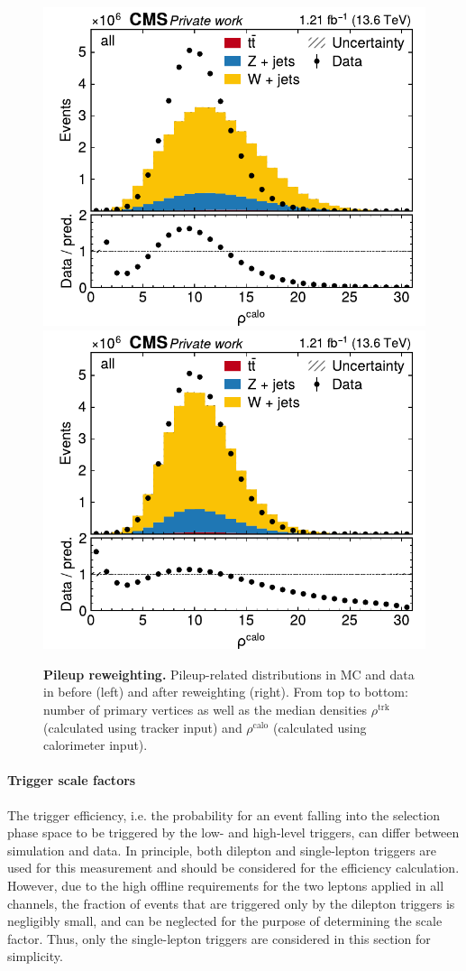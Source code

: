 \begin{figure}[p]
    \includegraphics[width=0.49 \textwidth]{figures/ttxs/pileup/rhoFastjetCentralCalo_orig.pdf}
    \hfill
    \includegraphics[width=0.49 \textwidth]{figures/ttxs/pileup/rhoFastjetCentralCalo_reweighted.pdf}
    \caption{\textbf{Pileup reweighting.} Pileup-related distributions in MC and data in before (left) and after reweighting (right). From top to bottom: number of primary vertices as well as the median \pt densities $\rho^{\mathrm{trk}}$ (calculated using tracker input) and $\rho^{\mathrm{calo}}$ (calculated using calorimeter input).}
    \label{fig:ttxs:pileup}
  \end{figure}

\paragraph{Trigger scale factors}

The trigger efficiency, i.e. the probability for an event falling into the selection phase space to be triggered by the low- and high-level triggers, can differ between simulation and data.
In principle, both dilepton and single-lepton triggers are used for this measurement and should be considered for the efficiency calculation. However, due to the high offline \pt requirements for the two leptons applied in all channels, the fraction of events that are triggered only by the dilepton triggers is negligibly small, and can be neglected for the purpose of determining the scale factor. Thus, only the single-lepton triggers are considered in this section for simplicity.


